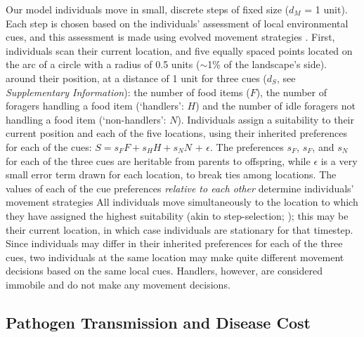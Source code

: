 Our model individuals move in small, discrete steps of fixed size ($d_M$ = 1 unit).
Each step is chosen based on the individuals' assessment of local environmental cues, and this assessment is made using evolved movement strategies \citep[as in][]{netz2021,gupte2021a}.
First, individuals scan their current location, and five equally spaced points located on the arc of a circle with a radius of 0.5 units ($\sim$1\% of the landscape's side).
around their position, at a distance of 1 unit for three cues ($d_S$, see \textit{Supplementary Information}): the number of food items ($F$), the number of foragers handling a food item (`handlers': $H$) and the number of idle foragers not handling a food item (`non-handlers': $N$).
Individuals assign a suitability \citep[see][]{netz2021,gupte2021a} to their current position and each of the five locations, using their inherited preferences for each of the cues: $S = s_FF + s_HH + s_NN$ + $\epsilon$.
The preferences $s_F$, $s_F$, and $s_N$ for each of the three cues are heritable from parents to offspring, while $\epsilon$ is a very small error term drawn for each location, to break ties among locations.
The values of each of the cue preferences \emph{relative to each other} determine individuals' movement strategies \citep{gupte2021a}
All individuals move simultaneously to the location to which they have assigned the highest suitability (akin to step-selection; \citealp{avgar2016}); this may be their current location, in which case individuals are stationary for that timestep.
Since individuals may differ in their inherited preferences for each of the three cues, two individuals at the same location may make quite different movement decisions based on the same local cues.
Handlers, however, are considered immobile and do not make any movement decisions.

\subsection*{Pathogen Transmission and Disease Cost}

